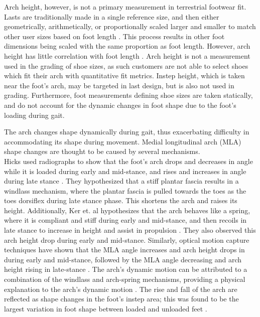 \documentclass[defaultstyle,11pt]{comps}
\begin{document}
Arch height, however, is not a primary measurement in terrestrial footwear fit.\\
Lasts are traditionally made in a single reference size, and then either geometrically, arithmetically, or proportionally scaled larger and smaller to match other user sizes based on foot length \citep{Luximon2013}.
This process results in other foot dimensions being scaled with the same proportion as foot length.
However, arch height has little correlation with foot length \citep{Hill2017}.
Arch height is not a measurement used in the grading of shoe sizes, as such customers are not able to select shoes which fit their arch with quantitative fit metrics.
Instep height, which is taken near the foot's arch, may be targeted in last design, but is also not used in grading.
Furthermore, foot measurements defining shoe sizes are taken statically, and do not account for the dynamic changes in foot shape due to the foot's loading during gait.

The arch changes shape dynamically during gait, thus exacerbating difficulty in accommodating its shape during movement.
Medial longitudinal arch (MLA) shape changes are thought to be caused by several mechanisms.\\
Hicks used radiographs to show that the foot's arch drops and decreases in angle while it is loaded during early and mid-stance, and rises and increases in angle during late stance \citep{Hicks1954}.
They hypothesized that a stiff plantar fascia results in a windlass mechanism, where the plantar fascia is pulled towards the toes as the toes dorsiflex during late stance phase.
This shortens the arch and raises its height.
Additionally, Ker et. al hypothesizes that the arch behaves like a spring, where it is compliant and stiff during early and mid-stance, and then recoils in late stance to increase in height and assist in propulsion \citep{Ker1987}.
They also observed this arch height drop during early and mid-stance.
Similarly, optical motion capture techniques have shown that the MLA angle increases and arch height drops in during early and mid-stance, followed by the MLA angle decreasing and arch height rising in late-stance \citep{Caravaggi2010, Cashmere1999, Leardini2007, Stolwijk2014}.
The arch's dynamic motion can be attributed to a combination of the windlass and arch-spring mechanisms, providing a physical explanation to the arch's dynamic motion \citep{Welte2021, Welte2018}.
The rise and fall of the arch are reflected as shape changes in the foot's instep area; this was found to be the largest variation in foot shape between loaded and unloaded feet \citep{Schuster2021}.
\end{document}
